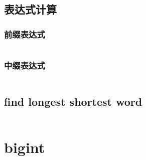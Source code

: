 \documentclass[a4paper,11pt]{article}
\begin{document}
\subsection{表达式计算}
\subsubsection{前缀表达式}
\inputminted[breaklines]{c++}{string/pre_expr.cpp}

\subsubsection{中缀表达式}
\inputminted[breaklines]{c++}{string/post_expr.cpp}
\subsection{find longest shortest word}
\inputminted[breaklines]{c++}{string/find_longest_shortest_word.cpp}

\section{bigint}
\inputminted[breaklines]{c++}{bigint/bigint.cpp}
\end{document}
